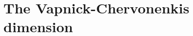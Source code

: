 \documentclass[../../main/main.tex]{subfiles}
\begin{document}
\chapter{The Vapnick-Chervonenkis dimension}
\end{document}
